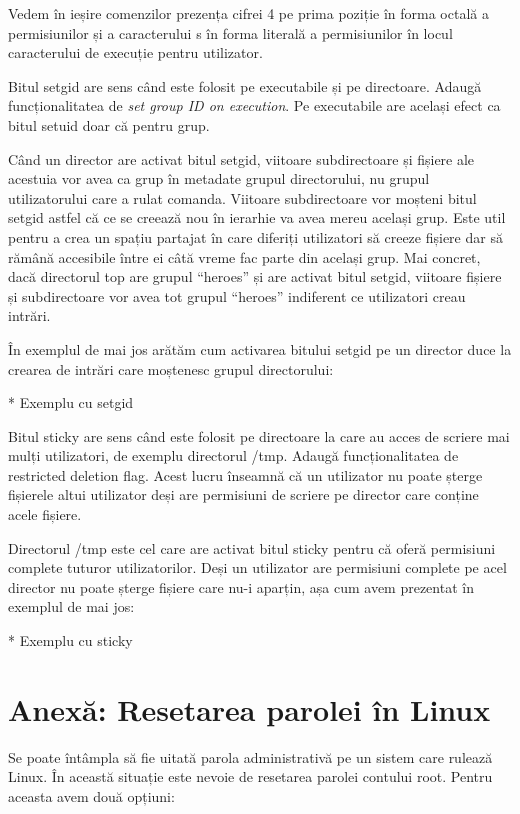 Vedem în ieșire comenzilor prezența cifrei 4 pe prima poziție în forma octală a
permisiunilor și a caracterului s în forma literală a permisiunilor în locul
caracterului de execuție pentru utilizator.

Bitul setgid are sens când este folosit pe executabile și pe directoare. Adaugă
funcționalitatea de \textit{set group ID on execution}. Pe executabile are
același efect ca bitul setuid doar că pentru grup.

Când un director are activat bitul setgid, viitoare subdirectoare și fișiere ale
acestuia vor avea ca grup în metadate grupul directorului, nu grupul
utilizatorului care a rulat comanda. Viitoare subdirectoare vor moșteni bitul
setgid astfel că ce se creează nou în ierarhie va avea mereu același grup. Este
util pentru a crea un spațiu partajat în care diferiți utilizatori să creeze
fișiere dar să rămână accesibile între ei câtă vreme fac parte din același grup.
Mai concret, dacă directorul top are grupul “heroes” și are activat bitul
setgid, viitoare fișiere și subdirectoare vor avea tot grupul “heroes”
indiferent ce utilizatori creau intrări.

În exemplul de mai jos arătăm cum activarea bitului setgid pe un director duce
la crearea de intrări care moștenesc grupul directorului:

* Exemplu cu setgid

Bitul sticky are sens când este folosit pe directoare la care au acces de
scriere mai mulți utilizatori, de exemplu directorul /tmp. Adaugă
funcționalitatea de restricted deletion flag. Acest lucru înseamnă că un
utilizator nu poate șterge fișierele altui utilizator deși are permisiuni de
scriere pe director care conține acele fișiere.

Directorul /tmp este cel care are activat bitul sticky pentru că oferă
permisiuni complete tuturor utilizatorilor. Deși un utilizator are permisiuni
complete pe acel director nu poate șterge fișiere care nu-i aparțin, așa cum
avem prezentat în exemplul de mai jos:

* Exemplu cu sticky

\section{Anexă: Resetarea parolei în Linux}
\label{sec:users-pass-restore-linux}

Se poate întâmpla să fie uitată parola administrativă pe un sistem care rulează
Linux. În această situație este nevoie de resetarea parolei contului root.
Pentru aceasta avem două opțiuni:

